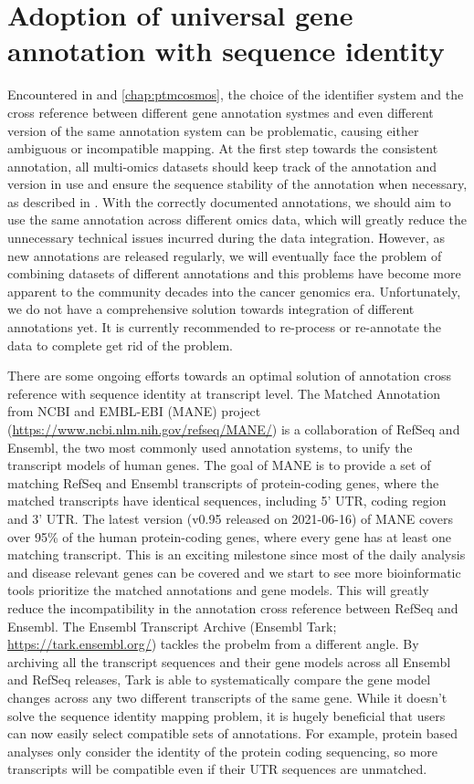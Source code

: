 \section{Adoption of universal gene annotation with sequence identity}
Encountered in  and \ref{chap:ptmcosmos}, the choice of the identifier system and the cross reference between different gene annotation systmes and even different version of the same annotation system can be problematic, causing either ambiguous or incompatible mapping. At the first step towards the consistent annotation, all multi-omics datasets should keep track of the annotation and version in use and ensure the sequence stability of the annotation when necessary, as described in . With the correctly documented annotations, we should aim to use the same annotation across different omics data, which will greatly reduce the unnecessary technical issues incurred during the data integration. However, as new annotations are released regularly, we will eventually face the problem of combining datasets of different annotations and this problems have become more apparent to the community decades into the cancer genomics era. Unfortunately, we do not have a comprehensive solution towards integration of different annotations yet. It is currently recommended to re-process or re-annotate the data to complete get rid of the problem.

There are some ongoing efforts towards an optimal solution of annotation cross reference with sequence identity at transcript level. The Matched Annotation from NCBI and EMBL-EBI (MANE) project (\url{https://www.ncbi.nlm.nih.gov/refseq/MANE/}) is a collaboration of RefSeq and Ensembl, the two most commonly used annotation systems, to unify the transcript models of human genes. The goal of MANE is to provide a set of matching RefSeq and Ensembl transcripts of protein-coding genes, where the matched transcripts have identical sequences, including 5' UTR, coding region and 3' UTR. The latest version (v0.95 released on 2021-06-16) of MANE covers over 95\% of the human protein-coding genes, where every gene has at least one matching transcript. This is an exciting milestone since most of the daily analysis and disease relevant genes can be covered and we start to see more bioinformatic tools prioritize the matched annotations and gene models. This will greatly reduce the incompatibility in the annotation cross reference between RefSeq and Ensembl. The Ensembl Transcript Archive (Ensembl Tark; \url{https://tark.ensembl.org/}) tackles the probelm from a different angle. By archiving all the transcript sequences and their gene models across all Ensembl and RefSeq releases, Tark is able to systematically compare the gene model changes across any two different transcripts of the same gene. While it doesn't solve the sequence identity mapping problem, it is hugely beneficial that users can now easily select compatible sets of annotations. For example, protein based analyses only consider the identity of the protein coding sequencing, so more transcripts will be compatible even if their UTR sequences are unmatched.

